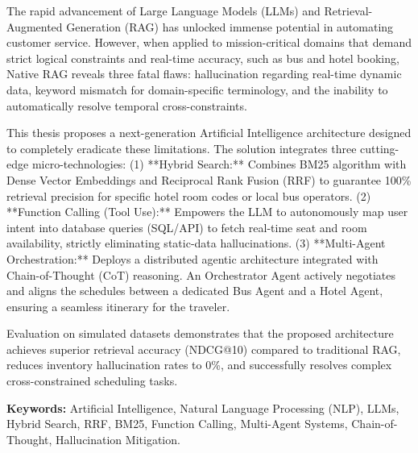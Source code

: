 The rapid advancement of Large Language Models (LLMs) and Retrieval-Augmented Generation (RAG) has unlocked immense potential in automating customer service. However, when applied to mission-critical domains that demand strict logical constraints and real-time accuracy, such as bus and hotel booking, Native RAG reveals three fatal flaws: hallucination regarding real-time dynamic data, keyword mismatch for domain-specific terminology, and the inability to automatically resolve temporal cross-constraints.

This thesis proposes a next-generation Artificial Intelligence architecture designed to completely eradicate these limitations. The solution integrates three cutting-edge micro-technologies:
(1) **Hybrid Search:** Combines BM25 algorithm with Dense Vector Embeddings and Reciprocal Rank Fusion (RRF) to guarantee 100\% retrieval precision for specific hotel room codes or local bus operators.
(2) **Function Calling (Tool Use):** Empowers the LLM to autonomously map user intent into database queries (SQL/API) to fetch real-time seat and room availability, strictly eliminating static-data hallucinations.
(3) **Multi-Agent Orchestration:** Deploys a distributed agentic architecture integrated with Chain-of-Thought (CoT) reasoning. An Orchestrator Agent actively negotiates and aligns the schedules between a dedicated Bus Agent and a Hotel Agent, ensuring a seamless itinerary for the traveler.

Evaluation on simulated datasets demonstrates that the proposed architecture achieves superior retrieval accuracy (NDCG@10) compared to traditional RAG, reduces inventory hallucination rates to 0\%, and successfully resolves complex cross-constrained scheduling tasks.

\textbf{Keywords:} Artificial Intelligence, Natural Language Processing (NLP), LLMs, Hybrid Search, RRF, BM25, Function Calling, Multi-Agent Systems, Chain-of-Thought, Hallucination Mitigation.
